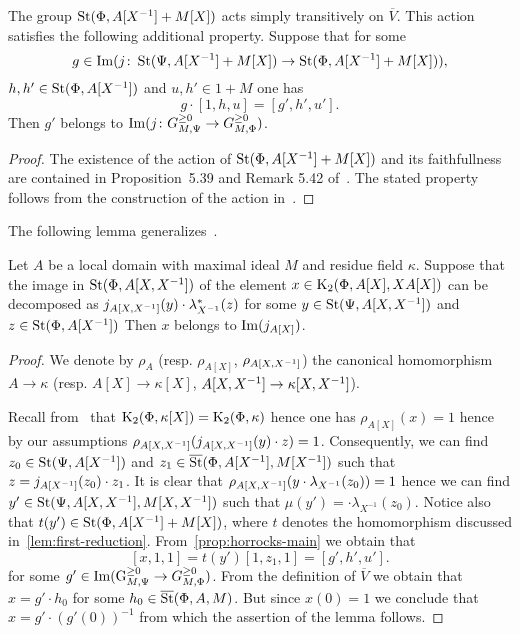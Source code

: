 \begin{prop} \label{prop:horrocks-main} The group $\operatorname{St}(\Phi, A[X^{-1}] + M[X])$ acts simply transitively on $\overline{V}$.
This action satisfies the following additional property.
Suppose that for some
\[g \in \operatorname{Im}(j\colon \operatorname{St}(\Psi, A[X^{-1}] + M[X]) \to \operatorname{St}(\Phi, A[X^{-1}] + M[X])), \]
$h, h' \in \operatorname{St}(\Phi, A[X^{-1}])$ and $u, h' \in 1 + M$ one has
\[ g \cdot [1, h, u] = [g', h', u'].\]
Then $g'$ belongs to $\operatorname{Im}(j\colon G_{M, \Psi}^{\geq 0} \to G_{M, \Phi}^{\geq 0})$.
\end{prop}
\begin{proof}
    The existence of the action of $\operatorname{St}(\Phi, A[X^{-1}] + M[X])$ and its faithfullness are contained in
    Proposition~5.39 and Remark 5.42 of~\cite{LS20}.
    The stated property follows from the construction of the action in~\cite[\S~5.4]{LS20}.
\end{proof}

The following lemma generalizes~\cite[Proposition~4.3(b)]{Tu83}.
\begin{lemma} \label{lem:horrocks-subsystem-local}
Let $A$ be a local domain with maximal ideal $M$ and residue field $\kappa$.
Suppose that the image in $\operatorname{St}(\Phi, A[X, X^{-1}])$ of the element $x \in \operatorname{K}_2(\Phi, A[X], XA[X])$
 can be decomposed as $j_{A[X, X^{-1}]}(y) \cdot \lambda_{X^{-1}}^*(z)$ for
 some $y \in \operatorname{St}(\Psi, A[X, X^{-1}])$ and $z \in \operatorname{St}(\Phi, A[X^{-1}])$
Then $x$ belongs to $\operatorname{Im}(j_{A[X]})$.
\end{lemma}
\begin{proof}
    We denote by $\rho_{A}$ (resp. $\rho_{A[X]}$, $\rho_{A[X, X^{-1}]}$) the canonical homomorphism
     $A \to \kappa$ (resp. $A[X] \to \kappa[X]$, $A[X, X^{-1}] \to \kappa[X, X^{-1}]$).

    Recall from~\cite{Hur77} that $\operatorname{K}_2(\Phi, \kappa[X]) = \operatorname{K}_2(\Phi, \kappa)$ hence one has $\rho_{A[X]}(x) = 1$
     hence by our assumptions $\rho_{A[X, X^{-1}]}(j_{A[X, X^{-1}]}(y) \cdot z) = 1$.
    Consequently, we can find $z_0 \in \operatorname{St}(\Psi, A[X^{-1}])$ and $z_1 \in \overline{\operatorname{St}}(\Phi, A[X^{-1}], M[X^{-1}])$
     such that $z = j_{A[X^{-1}]}(z_0) \cdot z_1$.
    It is clear that $\rho_{A[X, X^{-1}]}(y \cdot \lambda_{X^{-1}}(z_0)) = 1$ hence we can find
     $y' \in \operatorname{St}(\Psi, A[X, X^{-1}], M[X, X^{-1}])$ such that $\mu(y') = \cdot \lambda_{X^{-1}}(z_0)$.
    Notice also that $t(y') \in \operatorname{St}(\Phi, A[X^{-1}] + M[X])$, where $t$ denotes the homomorphism discussed in~\cref{lem:first-reduction}.
    From~\cref{prop:horrocks-main} we obtain that
    \[ [x, 1, 1 ] = t(y') [1, z_1, 1] = [g', h', u']. \]
    for some $g' \in \operatorname{Im}(\operatorname{G}_{M, \Psi}^{\geq 0} \to G_{M, \Phi}^{\geq 0})$.
    From the definition of $\overline{V}$ we obtain that $x = g' \cdot h_0$ for some $h_0 \in \overline{\operatorname{St}}(\Phi, A, M)$.
    But since $x(0) = 1$ we conclude that $x = g' \cdot (g'(0))^{-1}$ from which the assertion of the lemma follows.
\end{proof}

